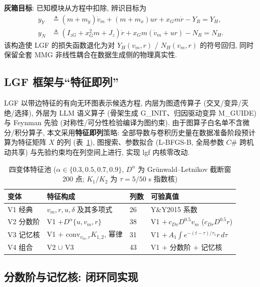 \documentclass[12pt,a4paper]{ctexart}
\begin{document}
\textbf{灰箱目标}: 已知模块从方程中扣除, 辨识目标为
\begin{align}
y_Y &\triangleq (m+m_y)\dot v_m + (m+m_x)ur + x_G m\dot r - Y_R = Y_H, \\
y_N &\triangleq (I_{zG}+x_G^2m+J_z)\dot r + x_G m(\dot v_m+ur) - N_R = N_H.
\end{align}
该构造使 LGF 的损失函数退化为对 $Y_H(v_m,r)$ / $N_H(v_m,r)$ 的符号回归, 同时保留全套 MMG 非线性耦合在数据生成侧的物理真实性.

\subsection{LGF 框架与``特征即列''}
\label{sec:lgf}

LGF 以带边特征的有向无环图表示候选方程, 内层为图遗传算子 (交叉/变异/灭绝/选择), 外层为 LLM 语义算子 (骨架生成 G\_INIT、归因驱动变异 M\_GUIDE) 与 Feynman 先验 (对称性/可分性检验编译为图约束). 由于图算子白名单不含微分/积分算子, 本文采用\textbf{特征即列}策略: 全部导数与卷积历史量在数据准备阶段预计算为特征矩阵 $X$ 的列 (表~\ref{tab:variants}), 图搜索、参数拟合 (L-BFGS-B, 全局参数 $C\#$ 跨机动共享) 与先验约束均在列空间上进行, 实现 lgf 内核零改动.

\begin{table}[htbp]
\centering\small
\caption{四变体特征池 ($\alpha \in \{0.3, 0.5, 0.7, 0.9\}$, $D^\alpha$ 为 Grünwald--Letnikov 截断窗 200 点; $K_1/K_2$ 为 $\tau=5/50$ s 指数核)}
\label{tab:variants}
\begin{tabular}{llll}
\toprule
变体 & 特征构成 & 列数 & 可验真值 \\
\midrule
V1 经典 & $v_m, r, u, \delta$ 及其多项式 & 26 & Y\&Y2015 系数 \\
V2 分数阶 & V1 $+ D^\alpha\{u, v_m, r\}$ & 38 & V1 $+\,c_{Dv}D^{0.5}v_m$ ($c_{Dr}D^{0.5}r$) \\
V3 记忆核 & V1 $+$ $\mathrm{conv}_{v_m,r}K_{1,2}$, 幂律 & 31 & V1 $+\,A_1\!\int\! e^{-(t-\tau)/\tau_1}r\,d\tau$ \\
V4 组合 & V2 $\cup$ V3 & 43 & V1 $+$ 分数阶 $+$ 记忆核 \\
\bottomrule
\end{tabular}
\end{table}

\subsection{分数阶与记忆核: 闭环同实现}
\label{sec:frac}
\end{document}
